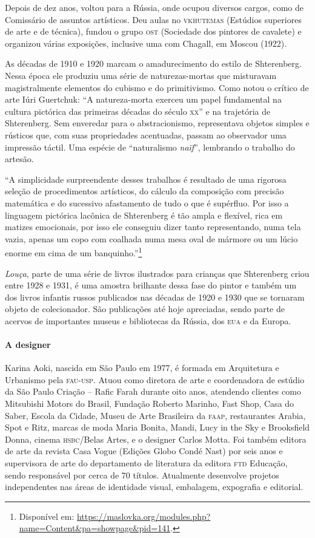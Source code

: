 \documentclass[11pt]{extarticle}
\begin{document}
Depois de dez anos, voltou para a Rússia, onde ocupou diversos cargos, como de Comissário de assuntos artísticos. Deu aulas no 	\textsc{vkhutemas} (Estúdios superiores de arte e de técnica), fundou o grupo \textsc{ost} (Sociedade dos pintores de cavalete) e organizou várias exposições, inclusive uma com Chagall, em Moscou (1922). 

As décadas de 1910 e 1920 marcam o amadurecimento do estilo de Shterenberg. Nessa época ele produziu uma série de naturezas-mortas que misturavam magistralmente elementos do cubismo e do primitivismo. Como notou o crítico de arte Iúri Guertchuk: “A natureza-morta exerceu um papel fundamental na cultura pictórica das primeiras décadas do século \textsc{xx}” e na trajetória de Shterenberg. Sem enveredar para o abstracionismo, representava objetos simples e rústicos que, com suas propriedades acentuadas, passam ao observador uma impressão táctil. Uma espécie de “naturalismo \textit{naïf}”, lembrando o trabalho do artesão. 

“A simplicidade surpreendente desses trabalhos é resultado de uma rigorosa seleção de procedimentos artísticos, do cálculo da composição com precisão matemática e do sucessivo afastamento de tudo o que é supérfluo. Por isso a linguagem pictórica lacônica de Shterenberg é tão ampla e flexível, rica em matizes emocionais, por isso ele conseguiu dizer tanto representando, numa tela vazia, apenas um copo com coalhada numa mesa oval de mármore ou um lúcio enorme em cima de um banquinho.”\footnote{Disponível em: \url{https://maslovka.org/modules.php?name=Content&pa=showpage&pid=141}.} 

\textit{Louça}, parte de uma série de livros ilustrados para crianças que Shterenberg criou entre 1928 e 1931, é uma amostra brilhante dessa fase do pintor e também um dos livros infantis russos publicados nas décadas de 1920 e 1930 que se tornaram objeto de colecionador. São publicações até hoje apreciadas, sendo parte de acervos de importantes museus e bibliotecas da Rússia, dos \textsc{eua} e da Europa.

\paragraph{A designer} Karina Aoki, nascida em São Paulo em 1977, é formada em Arquitetura e Urbanismo pela \textsc{fau-usp}. Atuou como diretora de arte e coordenadora de estúdio da São Paulo Criação -- Rafic Farah durante oito anos, atendendo clientes como Mitsubishi Motors do Brasil, Fundação Roberto Marinho, Fast Shop, Casa do Saber, Escola da Cidade, Museu de Arte Brasileira da \textsc{faap}, restaurantes Arabia, Spot e Ritz, marcas de moda Maria Bonita, Mandi, Lucy in the Sky e
Brooksfield Donna, cinema \textsc{hsbc}/Belas Artes, e o designer Carlos Motta. Foi também editora de arte da revista Casa Vogue (Edições Globo Condé Nast) por seis anos e supervisora de arte do departamento de literatura da editora \textsc{ftd} Educação, sendo responsável por cerca de 70 títulos. Atualmente desenvolve projetos independentes nas áreas de identidade visual, embalagem, expografia e editorial.
\end{document}
